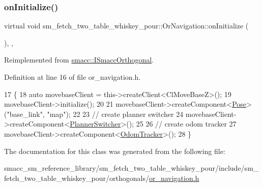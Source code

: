 \subsubsection{\texorpdfstring{on\+Initialize()}{onInitialize()}}
{\footnotesize\ttfamily virtual void sm\+\_\+fetch\+\_\+two\+\_\+table\+\_\+whiskey\+\_\+pour\+::\+Or\+Navigation\+::on\+Initialize (\begin{DoxyParamCaption}{ }\end{DoxyParamCaption})\hspace{0.3cm}{\ttfamily [inline]}, {\ttfamily [override]}, {\ttfamily [virtual]}}



Reimplemented from \hyperlink{classsmacc_1_1ISmaccOrthogonal_a6bb31c620cb64dd7b8417f8705c79c7a}{smacc\+::\+I\+Smacc\+Orthogonal}.



Definition at line 16 of file or\+\_\+navigation.\+h.


\begin{DoxyCode}
17     \{
18         \textcolor{keyword}{auto} movebaseClient = this->createClient<ClMoveBaseZ>();
19         movebaseClient->initialize();
20 
21         movebaseClient->createComponent<\hyperlink{classcl__move__base__z_1_1Pose}{Pose}>(\textcolor{stringliteral}{"base\_link"}, \textcolor{stringliteral}{"map"});
22 
23         \textcolor{comment}{// create planner switcher}
24         movebaseClient->createComponent<\hyperlink{classcl__move__base__z_1_1PlannerSwitcher}{PlannerSwitcher}>();
25 
26         \textcolor{comment}{// create odom tracker}
27         movebaseClient->createComponent<\hyperlink{classcl__move__base__z_1_1odom__tracker_1_1OdomTracker}{OdomTracker}>();
28     \}
\end{DoxyCode}


The documentation for this class was generated from the following file\+:\begin{DoxyCompactItemize}
\item 
smacc\+\_\+sm\+\_\+reference\+\_\+library/sm\+\_\+fetch\+\_\+two\+\_\+table\+\_\+whiskey\+\_\+pour/include/sm\+\_\+fetch\+\_\+two\+\_\+table\+\_\+whiskey\+\_\+pour/orthogonals/\hyperlink{sm__fetch__two__table__whiskey__pour_2include_2sm__fetch__two__table__whiskey__pour_2orthogonals_2or__navigation_8h}{or\+\_\+navigation.\+h}\end{DoxyCompactItemize}
